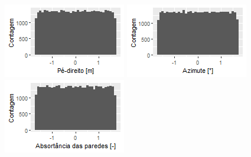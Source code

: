 \documentclass{article}
\begin{document}
\begin{figure}[h!]
\begin{minipage}{.33\textwidth}
	\end{minipage}%
	\begin{minipage}{.33\textwidth}
		\centering
		\includegraphics[width=\linewidth]{zscore_plot_height.png}
	\end{minipage}
	\centering
	\begin{minipage}{.33\textwidth}
		\centering
		\includegraphics[width=\linewidth]{zscore_plot_azimute.png}
	\end{minipage}%
	\begin{minipage}{.33\textwidth}
		\centering
		\includegraphics[width=\linewidth]{zscore_plot_abs_wall.png}

\end{minipage}
\end{figure}
\end{document}
